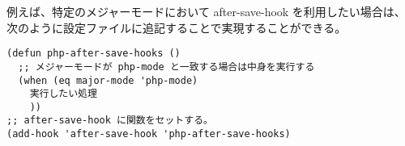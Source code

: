 例えば、特定のメジャーモードにおいて after-save-hook を利用したい場合は、次のように設定ファイルに追記することで実現することができる。
\begin{mdframed}[roundcorner=0.50zw,leftmargin=3.00zw,rightmargin=3.00zw,skipabove=0.40zw,skipbelow=0.40zw,innertopmargin=4.00pt,innerbottommargin=4.00pt,innerleftmargin=5.00pt,innerrightmargin=5.00pt,linecolor=gray!020,linewidth=0.50pt,backgroundcolor=gray!20]
\begin{verbatim}
(defun php-after-save-hooks ()
  ;; メジャーモードが php-mode と一致する場合は中身を実行する
  (when (eq major-mode 'php-mode)
    実行したい処理
    ))
;; after-save-hook に関数をセットする。
(add-hook 'after-save-hook 'php-after-save-hooks)
\end{verbatim}
\end{mdframed}
